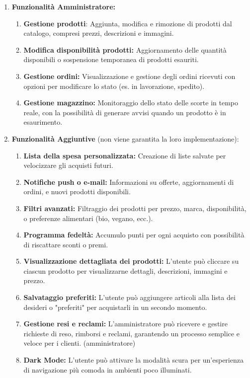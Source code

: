 \documentclass[a4paper,12pt]{article}
\begin{document}
\begin{enumerate}
\begin{enumerate}
   \item\textbf{Funzionalità Amministratore: }
       \begin{enumerate}[start=12, label=\arabic*.]
       \item \textbf{Gestione prodotti}: Aggiunta, modifica e rimozione di prodotti dal catalogo, compresi prezzi, descrizioni e immagini.
       \item \textbf{Modifica disponibilità prodotti: }Aggiornamento delle quantità disponibili o sospensione temporanea di prodotti esauriti.
       \item \textbf{Gestione ordini:} Visualizzazione e gestione degli ordini ricevuti con opzioni per modificare lo stato (es. in lavorazione, spedito).
       \item \textbf{Gestione magazzino:} Monitoraggio dello stato delle scorte in tempo reale, con la possibilità di generare avvisi quando un prodotto è in esaurimento.
       \end{enumerate}
   
   \item{\textbf{Funzionalità Aggiuntive} (non viene garantita la loro implementazione)}: 
       \begin{enumerate}[start=16, label=\arabic*.]
       \item \textbf{Lista della spesa personalizzata:} Creazione di liste salvate per velocizzare gli acquisti futuri.
       \item \textbf{Notifiche push o e-mail:} Informazioni su offerte, aggiornamenti di ordini, e nuovi prodotti disponibili.
       \item \textbf{Filtri avanzati:} Filtraggio dei prodotti per prezzo, marca, disponibilità, o preferenze alimentari (bio, vegano, ecc.).
       \item \textbf{Programma fedeltà: }Accumulo punti per ogni acquisto con possibilità di riscattare sconti o premi.
       \item \textbf{Visualizzazione dettagliata dei prodotti: }L'utente può cliccare su ciascun prodotto per visualizzarne dettagli, descrizioni, immagini e prezzo.
       \item \textbf{Salvataggio preferiti:} L'utente può aggiungere articoli alla lista dei desideri o "preferiti" per acquistarli in un secondo momento.
       \item \textbf{Gestione resi e reclami:} L'amministratore può ricevere e gestire richieste di reso, rimborsi e reclami, garantendo un processo semplice e veloce per i clienti. (amministratore)
       \item \textbf{Dark Mode:} L'utente può attivare la modalità scura per un'esperienza di navigazione più comoda in ambienti poco illuminati.
       \end{enumerate}
   

\end{enumerate}
\end{enumerate}
\end{document}
